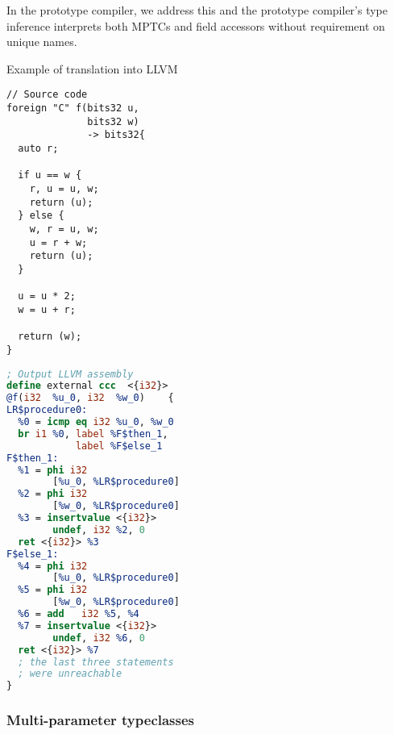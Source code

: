 In the prototype compiler, we address this and the prototype compiler's type inference interprets both MPTCs and field accessors without requirement on unique names.
\begin{listing}
    \small
    \caption{Example of translation into LLVM}
    \label{lst:translex}
    \begin{center}
    \begin{minipage}{0.5\linewidth}
    \begin{lstlisting}
// Source code
foreign "C" f(bits32 u,
              bits32 w)
              -> bits32{
  auto r;

  if u == w {
    r, u = u, w;
    return (u);
  } else {
    w, r = u, w;
    u = r + w;
    return (u);
  }

  u = u * 2;
  w = u + r;

  return (w);
}
    \end{lstlisting}
    \end{minipage}%
    \begin{minipage}{0.5\linewidth}
    \begin{lstlisting}[language=LLVM]
; Output LLVM assembly
define external ccc  <{i32}>
@f(i32  %u_0, i32  %w_0)    {
LR$procedure0:
  %0 = icmp eq i32 %u_0, %w_0
  br i1 %0, label %F$then_1,
            label %F$else_1
F$then_1:
  %1 = phi i32
        [%u_0, %LR$procedure0]
  %2 = phi i32
        [%w_0, %LR$procedure0]
  %3 = insertvalue <{i32}>
        undef, i32 %2, 0
  ret <{i32}> %3
F$else_1:
  %4 = phi i32
        [%u_0, %LR$procedure0]
  %5 = phi i32
        [%w_0, %LR$procedure0]
  %6 = add   i32 %5, %4
  %7 = insertvalue <{i32}>
        undef, i32 %6, 0
  ret <{i32}> %7
  ; the last three statements
  ; were unreachable
}
    \end{lstlisting}
    \end{minipage}
    \end{center}
\end{listing}

\subsubsection{Multi-parameter typeclasses}
\label{sec:mptcs}

